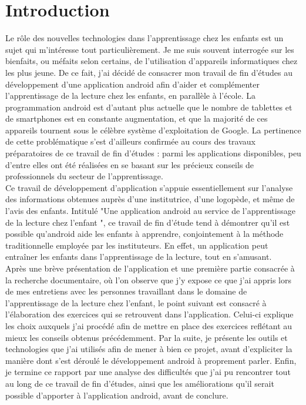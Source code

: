 \section{Introduction}
Le rôle des nouvelles technologies dans l'apprentissage chez les enfants est un sujet qui m'intéresse tout particulièrement. Je me suis souvent interrogée sur les bienfaits, ou méfaits selon certains, de l'utilisation d'appareils informatiques chez les plus jeune. De ce fait, j'ai décidé de consacrer mon travail de fin d'études au développement d'une application android afin d'aider et complémenter l'apprentissage de la lecture chez les enfants, en parallèle à l'école. La programmation android est d'autant plus actuelle que le nombre de tablettes et de smartphones est en constante augmentation, et que la majorité de ces appareils tournent sous le célèbre système d'exploitation de Google. La pertinence de cette problématique s'est d'ailleurs confirmée au cours des travaux préparatoires de ce travail de fin d'études : parmi les applications disponibles, peu d'entre elles ont été réalisées en se basant sur les précieux conseils de professionnels du secteur de l'apprentissage.\\

Ce travail de développement d'application s'appuie essentiellement sur l'analyse des informations obtenues auprès d'une institutrice, d'une logopède, et même de l'avis des enfants. Intitulé "Une application android au service de l'apprentissage de la lecture chez l'enfant ", ce travail de fin d'étude tend à démontrer qu'il est possible qu'android aide les enfants à apprendre, conjointement à la méthode traditionnelle employée par les instituteurs. En effet, un application peut entraîner les enfants dans l'apprentissage de la lecture, tout en s'amusant.\\

Après une brève présentation de l'application et une première partie consacrée à la recherche documentaire, où l'on observe que j'y expose ce que j'ai appris lors de mes entretiens avec les personnes travaillant dans le domaine de l'apprentissage de la lecture chez l'enfant, le point suivant est consacré à l'élaboration des exercices qui se retrouvent dans l'application. Celui-ci explique les choix auxquels j'ai procédé afin de mettre en place des exercices reflétant au mieux les conseils obtenus précédemment. Par la suite, je présente les outils et technologies que j'ai utilisés afin de mener à bien ce projet, avant d'expliciter la manière dont s'est déroulé le développement android à proprement parler. Enfin, je termine ce rapport par une analyse des difficultés que j'ai pu rencontrer tout au long de ce travail de fin d'études, ainsi que les améliorations qu'il serait possible d'apporter à l'application android, avant de conclure.
